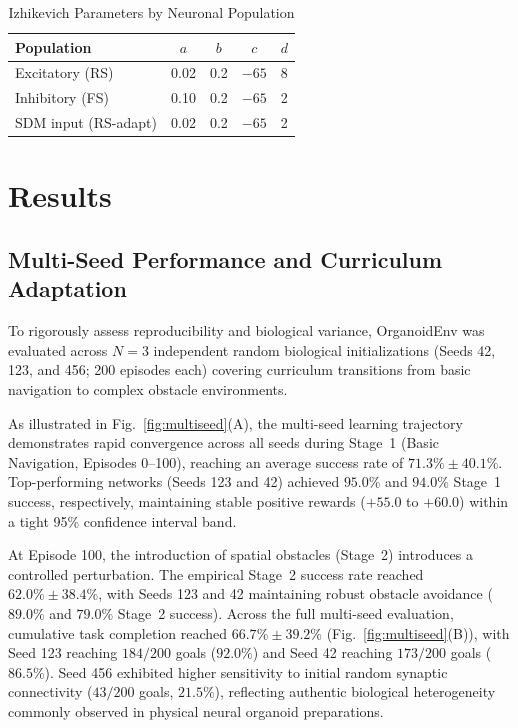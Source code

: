 \documentclass[journal,twocolumn]{IEEEtran}
\begin{document}
\begin{table}[h]
\centering
\renewcommand{\arraystretch}{1.3}
\caption{Izhikevich Parameters by Neuronal Population}
\label{table:izhikevich}
\begin{tabular}{lcccc}
\toprule
\textbf{Population} & $a$ & $b$ & $c$ & $d$ \\
\midrule
Excitatory (RS) & 0.02 & 0.2 & $-65$ & 8 \\
Inhibitory (FS) & 0.10 & 0.2 & $-65$ & 2 \\
SDM input (RS-adapt) & 0.02 & 0.2 & $-65$ & 2 \\
\bottomrule
\end{tabular}
\end{table}

\section{Results}

\subsection{Multi-Seed Performance and Curriculum Adaptation}

To rigorously assess reproducibility and biological variance, OrganoidEnv was evaluated across $N=3$ independent random biological initializations (Seeds 42, 123, and 456; 200 episodes each) covering curriculum transitions from basic navigation to complex obstacle environments.

As illustrated in Fig.~\ref{fig:multiseed}(A), the multi-seed learning trajectory demonstrates rapid convergence across all seeds during Stage~1 (Basic Navigation, Episodes 0--100), reaching an average success rate of $71.3\% \pm 40.1\%$. Top-performing networks (Seeds 123 and 42) achieved $95.0\%$ and $94.0\%$ Stage~1 success, respectively, maintaining stable positive rewards ($+55.0$ to $+60.0$) within a tight 95\% confidence interval band. 

At Episode 100, the introduction of spatial obstacles (Stage~2) introduces a controlled perturbation. The empirical Stage~2 success rate reached $62.0\% \pm 38.4\%$, with Seeds 123 and 42 maintaining robust obstacle avoidance ($89.0\%$ and $79.0\%$ Stage~2 success). Across the full multi-seed evaluation, cumulative task completion reached $66.7\% \pm 39.2\%$ (Fig.~\ref{fig:multiseed}(B)), with Seed 123 reaching $184/200$ goals ($92.0\%$) and Seed 42 reaching $173/200$ goals ($86.5\%$). Seed 456 exhibited higher sensitivity to initial random synaptic connectivity ($43/200$ goals, $21.5\%$), reflecting authentic biological heterogeneity commonly observed in physical neural organoid preparations.
\end{document}
